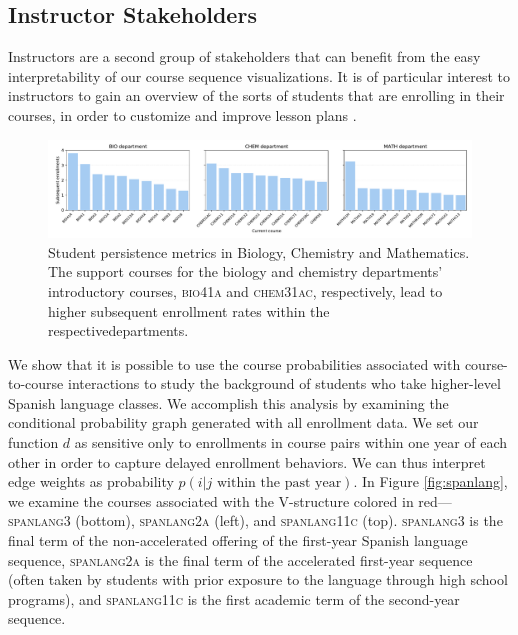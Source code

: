 \documentclass{sigchi}
\begin{document}
\subsection{Instructor Stakeholders}
\label{sec:instructor_stakeholders}

Instructors are a second group of stakeholders that can benefit from
the easy interpretability of our course sequence visualizations. It is
of particular interest to instructors to gain an overview of the sorts
of students that are enrolling in their courses, in order to customize
and improve lesson plans \cite{Leaver2002}.

\begin{figure}[h!]
    \centering
    \includegraphics[width=18cm]{final-persistence.pdf}
    \caption{Student persistence metrics in Biology, Chemistry and
      Mathematics. The support courses for the biology and chemistry
      departments' introductory courses, \textsc{bio41a} and \textsc{chem31ac},
      respectively, lead to higher subsequent enrollment rates within
      the respectivedepartments.}
    \label{fig:persistence}
\end{figure}

We show that it is possible to use the
course probabilities associated with course-to-course interactions to
study the background of students who take higher-level Spanish
language classes. We accomplish this analysis by examining the
conditional probability graph generated with all enrollment data. We
set our function $d$ as sensitive only to enrollments in course pairs
within one year of each other in order to capture delayed enrollment
behaviors. We can thus interpret edge weights as probability $p(i|j
\text{ within the past year})$. In Figure \ref{fig:spanlang}, we examine the courses associated with
the V-structure colored in red--- \textsc{spanlang3} (bottom),
\textsc{spanlang2a} (left), and \textsc{spanlang11c} (top). \textsc{spanlang3} is the final term of the non-accelerated
offering of the first-year Spanish language sequence,
\textsc{spanlang2a} is the final term of the accelerated first-year
sequence (often taken by students with prior exposure to the language
through high school programs), and \textsc{spanlang11c} is the first
academic term of the second-year sequence.
\end{document}
